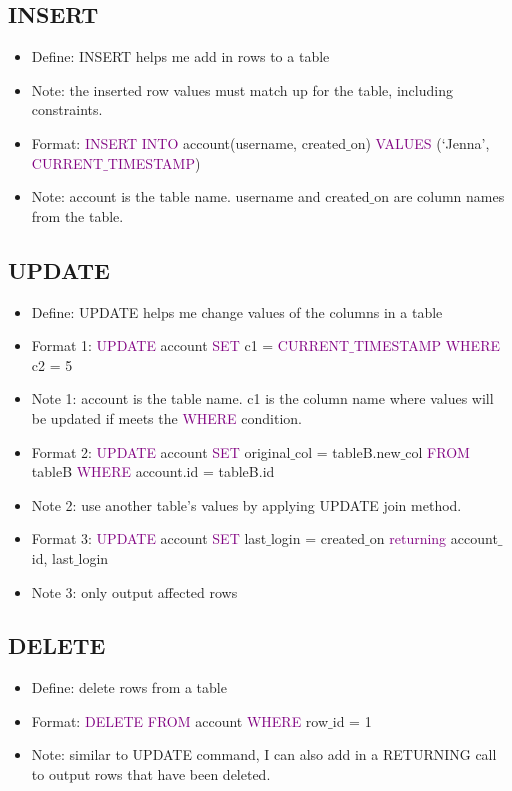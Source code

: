 \documentclass[a4paper]{article}
\begin{document}
\subsection{INSERT}
\begin{itemize}
  \item Define: INSERT helps me add in rows to a table
  \item Note: the inserted row values must match up for the table, including constraints.
  \item Format: \textcolor{purple}{INSERT INTO} account(username, created$\_$on) \textcolor{purple}{VALUES} (`Jenna', \textcolor{purple}{CURRENT$\_$TIMESTAMP})
  \item Note: account is the table name. username and created$\_$on are column names from the table.
\end{itemize}

\subsection{UPDATE}
\begin{itemize}
  \item Define: UPDATE helps me change values of the columns in a table
  \item Format 1: \textcolor{purple}{UPDATE} account \textcolor{purple}{SET} c1 = \textcolor{purple}{CURRENT$\_$TIMESTAMP} \textcolor{purple}{WHERE} {c2 = 5}
  \item Note 1: account is the table name. c1 is the column name where values will be updated if meets the \textcolor{purple}{WHERE} condition.
  \item Format 2: \textcolor{purple}{UPDATE} account \textcolor{purple}{SET} original$\_$col = tableB.new$\_$col \textcolor{purple}{FROM} tableB \textcolor{purple}{WHERE} account.id = tableB.id
  \item Note 2: use another table's values by applying UPDATE join method.
  \item Format 3: \textcolor{purple}{UPDATE} account \textcolor{purple}{SET} last$\_$login = created$\_$on \textcolor{purple}{returning} account$\_$id, last$\_$login
  \item Note 3: only output affected rows
\end{itemize}

\subsection{DELETE}
\begin{itemize}
  \item Define: delete rows from a table
  \item Format: \textcolor{purple}{DELETE FROM} account \textcolor{purple}{WHERE} row$\_$id = 1
  \item Note: similar to UPDATE command, I can also add in a RETURNING call to output rows that have been deleted.
\end{itemize}
\end{document}
